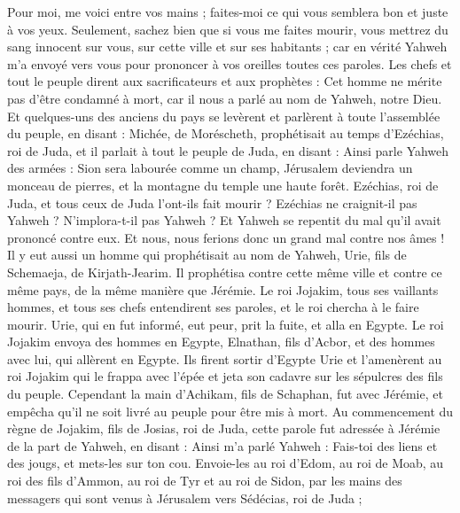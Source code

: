\begin{multicols}{2}
Pour moi, me voici entre vos mains ; faites-moi ce qui vous semblera bon et juste à vos yeux.
Seulement, sachez bien que si vous me faites mourir, vous mettrez du sang innocent sur vous, sur cette ville et sur ses habitants ; car en vérité Yahweh m'a envoyé vers vous pour prononcer à vos oreilles toutes ces paroles.
Les chefs et tout le peuple dirent aux sacrificateurs et aux prophètes : Cet homme ne mérite pas d'être condamné à mort, car il nous a parlé au nom de Yahweh, notre Dieu.
Et quelques-uns des anciens du pays se levèrent et parlèrent à toute l'assemblée du peuple, en disant :
Michée, de Moréscheth, prophétisait au temps d'Ezéchias, roi de Juda, et il parlait à tout le peuple de Juda, en disant : Ainsi parle Yahweh des armées : Sion sera labourée comme un champ, Jérusalem deviendra un monceau de pierres, et la montagne du temple une haute forêt.
Ezéchias, roi de Juda, et tous ceux de Juda l’ont-ils fait mourir ? Ezéchias ne craignit-il pas Yahweh ? N’implora-t-il pas Yahweh ? Et Yahweh se repentit du mal qu'il avait prononcé contre eux. Et nous, nous ferions donc un grand mal contre nos âmes !
Il y eut aussi un homme qui prophétisait au nom de Yahweh, Urie, fils de Schemaeja, de Kirjath-Jearim. Il prophétisa contre cette même ville et contre ce même pays, de la même manière que Jérémie.
Le roi Jojakim, tous ses vaillants hommes, et tous ses chefs entendirent ses paroles, et le roi chercha à le faire mourir. Urie, qui en fut informé, eut peur, prit la fuite, et alla en Egypte.
Le roi Jojakim envoya des hommes en Egypte, Elnathan, fils d’Acbor, et des hommes avec lui, qui allèrent en Egypte.
Ils firent sortir d'Egypte Urie et l'amenèrent au roi Jojakim qui le frappa avec l'épée et jeta son cadavre sur les sépulcres des fils du peuple.
Cependant la main d'Achikam, fils de Schaphan, fut avec Jérémie, et empêcha qu’il ne soit livré au peuple pour être mis à mort.
\VerseOne{}Au commencement du règne de Jojakim, fils de Josias, roi de Juda, cette parole fut adressée à Jérémie de la part de Yahweh, en disant :
Ainsi m’a parlé Yahweh : Fais-toi des liens et des jougs, et mets-les sur ton cou.
Envoie-les au roi d'Edom, au roi de Moab, au roi des fils d’Ammon, au roi de Tyr et au roi de Sidon, par les mains des messagers qui sont venus à Jérusalem vers Sédécias, roi de Juda ;

\end{multicols}
